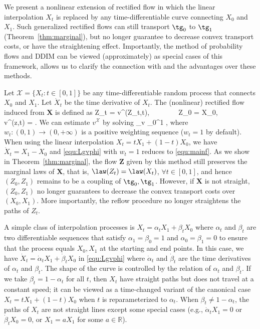 \documentclass[11pt]{article}
\newcommand{\X}{\mathcal{X}}
\newcommand{\vv}[1]{\boldsymbol{#1}}
\newcommand{\RR}{\mathbb{R}}
\newcommand{\norm}[1]{\left\|#1\right\|}
\def\bb#1\ee{\begin{align*}#1\end{align*}}
\begin{document}
We %
present a nonlinear
  extension of rectified flow  
  in which the  linear interpolation  $X_t$  is replaced by any time-differentiable curve connecting $X_0$ and $X_1$. 
    Such generalized rectified flows can still  transport $\tg_0$ to $\tg_1$ (Theorem~\ref{thm:marginal}),  
    but no longer guarantee to decrease convex transport costs, or have the straightening effect. 
Importantly, 
the method of  probability flows \citep{song2020score} and  DDIM \citep{song2020denoising} can be viewed (approximately) as special cases of this framework, 
allows us to clarify the connection with and the advantages over these methods. 

Let 
$\X = \{X_t\colon t\in[0,1]\}$  be  any  time-differentiable 
random process that connects $X_0$ and $X_1$. Let $\dot X_t$ be the time derivative of $X_t$. 
The (nonlinear) rectified flow induced from $\vv X$ is defined as 
\bb 
\d Z_t = v^\X(Z_t,t)\dt, ~~~~~~~ Z_0 = X_0, ~~~~   ~~~~ v^\X(z,t) = .%
\ee 
We can estimate $v^\X$ by solving 
\bbb \label{equ:Lgvphi}
\min_{v} %
\int_0^1 
\e{ w_t 
\norm{v(X_t, ~t) - \ddtdot X_t }^2}   \dt 
, 
\eee 
where %
$w_t \colon (0,1)\to (0,+\infty)$ is a positive weighting sequence ($w_t=1$ by default). 
When using the linear interpolation $X_t=tX_1 + (1-t)X_0$, we have $\dot X_t = X_1- X_0$ and 
\eqref{equ:Lgvphi} with $w_t=1$ reduces to \eqref{equ:mainf}. 
As we show in Theorem~\ref{thm:marginal}, 
the flow $\vv Z$ given by this method 
still preserves the marginal laws of $\vv X$, that is, $\law(Z_t)=\law(X_t)$, $\forall t\in[0,1]$, and hence  
$(Z_0,Z_1)$ remains to be a coupling of $\tg_0,\tg_1$. 
However, if $\vv X$ is not straight, 
$(Z_0,Z_1)$ no longer guarantees to decrease the convex transport costs over $(X_0,X_1)$. More importantly,  the reflow procedure no longer straightens the paths of $Z_t$. 


A simple class of interpolation processes is $X_t = \alpha_t X_1 + \beta_t X_0$ where $\alpha_t$ and $\beta_t$ 
are two differentiable sequences that satisfy $\alpha_1=\beta_0=1$ and $\alpha_0=\beta_1 = 0$ to ensure that the process equals $X_0,X_1$ at the starting and end points. In this case,
we have $\dot X_t = \dot \alpha_t X_1 + \dot \beta_t X_0$ in \eqref{equ:Lgvphi} where $\dot \alpha_t$ and $\dot\beta_t$ are the time derivatives of $\alpha_t$ and $\beta_t$. 
The shape of the curve is controlled by the relation of $\alpha_t$ and $\beta_t$. If we take $ \beta_t =1-\alpha_t$ for all $t$, then  $X_t$ have  straight paths but does not travel at a constant speed; it can be viewed as a time-changed variant of the canonical case $X_t = t X_1 + (1-t)X_0$ when $t$ is reparameterized to $\alpha_t$. %
When $\beta_t\neq 1-\alpha_t$, the paths of $X_t$ 
are not straight lines except some special cases (e.g., $\dot\alpha_t X_1=0$ or $\dot \beta_t X_0 = 0$, or $X_1 = a X_1$ for some $a\in\RR$).
\end{document}
